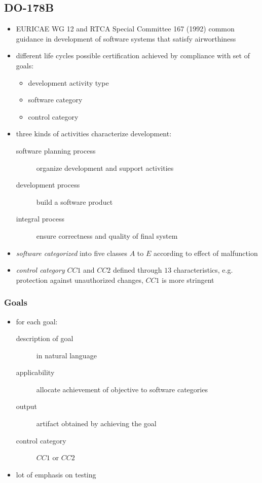 \documentclass[a4paper, 10pt]{article}
\begin{document}
\subsection*{DO-178B}
\begin{itemize}
    \item EURICAE WG 12 and RTCA Special Committee 167 (1992) \follows common guidance in development of software systems that satisfy airworthiness
    \item different life cycles possible \follows certification achieved by compliance with set of goals:
    \begin{itemize}
        \item development activity type
        \item software category
        \item control category
    \end{itemize}
    \item three kinds of activities characterize development:
    \begin{description}
        \item[software planning process] organize development and support activities
        \item[development process] build a software product
        \item[integral process] ensure correctness and quality of final system
    \end{description}
    \item \emph{software categorized} into five classes $A$ to $E$ according to effect of malfunction
    \item \emph{control category} $CC1$ and $CC2$ defined through $13$ characteristics, e.g. protection against unauthorized changes, $CC1$ is more stringent
\end{itemize}

\subsubsection*{Goals}
\begin{itemize}
    \item for each goal:
    \begin{description}
        \item[description of goal] in natural language
        \item[applicability] allocate achievement of objective to software categories
        \item[output] artifact obtained by achieving the goal
        \item[control category] $CC1$ or $CC2$
    \end{description}
    \item lot of emphasis on testing
\end{itemize}
\end{document}
